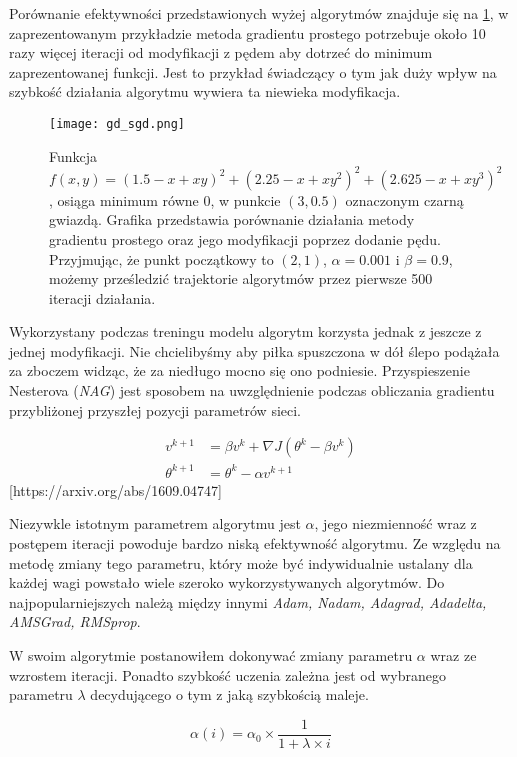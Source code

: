 \documentclass[]{article}
\theoremstyle{definition}
\begin{document}
Porównanie efektywności przedstawionych wyżej algorytmów znajduje się na \figurename{} \ref{fig:gd_sgd}, w zaprezentowanym przykładzie metoda gradientu prostego potrzebuje około 10 razy więcej iteracji od modyfikacji z pędem aby dotrzeć do minimum zaprezentowanej funkcji. Jest to przykład świadczący o tym jak duży wpływ na szybkość działania algorytmu wywiera ta niewieka modyfikacja. 


\begin{figure}[htp!]
	\centering
	\texttt{[image: gd\_sgd.png]}
	\caption{Funkcja  $f(x,y) =(1.5 - x + xy)^2 + (2.25 - x + xy^2)^2 + (2.625 - x + xy^3)^2$, osiąga minimum równe 0, w punkcie $(3,0.5)$ oznaczonym  czarną gwiazdą. Grafika przedstawia porównanie działania metody gradientu prostego oraz jego modyfikacji poprzez dodanie pędu. Przyjmując, że punkt początkowy to $(2,1)$, $\alpha = 0.001$ i $\beta = 0.9$, możemy prześledzić trajektorie algorytmów przez pierwsze 500 iteracji działania.} 
	\label{fig:gd_sgd}
\end{figure}


Wykorzystany podczas treningu modelu algorytm korzysta jednak z jeszcze z jednej modyfikacji. Nie chcielibyśmy aby piłka spuszczona w dół ślepo podążała za zboczem widząc, że za niedługo mocno się ono podniesie. Przyspieszenie Nesterova (\textit{NAG}) jest sposobem na uwzględnienie podczas obliczania gradientu przybliżonej przyszłej pozycji parametrów sieci.	

\begin{align} 
v^{k+1} &=  \beta v^{k}+ \nabla J(\theta^{k} - \beta v^{k}) \\[0.4em]
\theta^{k+1} &=  \theta^{k }- \alpha v^{k+1}
\end{align}
[https://arxiv.org/abs/1609.04747]


Niezywkle istotnym parametrem algorytmu jest $\alpha$, jego niezmienność wraz z postępem iteracji powoduje bardzo niską efektywność algorytmu. Ze względu na metodę zmiany tego parametru, który może być indywidualnie ustalany dla każdej wagi powstało wiele szeroko wykorzystywanych algorytmów. Do najpopularniejszych należą między innymi \textit{Adam, Nadam, Adagrad, Adadelta, AMSGrad, RMSprop}. 

W swoim algorytmie postanowiłem dokonywać zmiany parametru $\alpha$ wraz ze wzrostem iteracji. Ponadto szybkość uczenia zależna jest od wybranego parametru $\lambda$ decydującego o tym z jaką szybkością maleje.

\begin{equation}
\alpha(i) = \alpha_0 \times \frac{1}{1 + \lambda \times i}
\end{equation}
\end{document}
